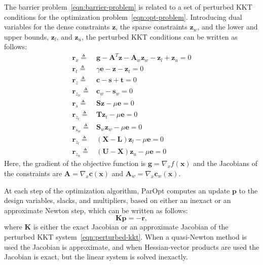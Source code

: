 \documentclass[12pt]{article}
\newcommand{\mb}{\mathbf}
\begin{document}
The barrier problem~\eqref{eqn:barrier-problem} is related to a set of perturbed KKT conditions for the optimization problem~\eqref{eqn:opt-problem}.
Introducing dual variables for the dense constraints $\mb{z}$, the sparse constraints $\mb{z}_{w}$, and the lower and upper bounds, $\mb{z}_{l}$, and $\mb{z}_{u}$, the perturbed KKT conditions can be written as follows:
%
\begin{equation}
  \label{eqn:perturbed-kkt}
  \begin{aligned}
    \mb{r}_{x} \triangleq    & \mb{g} - \mb{A}^{T}\mb{z} - \mb{A}_{w} \mb{z}_{w} - \mb{z}_{l} + \mb{z}_{u} = 0 \\
    \mb{r}_{t} \triangleq    & \gamma \mb{e} - \mb{z} - \mb{z}_{t} = 0 \\
    \mb{r}_{z} \triangleq    & \mb{c} - \mb{s} + \mb{t} = 0 \\
    \mb{r}_{z_{w}} \triangleq & \mb{c}_{w} - \mb{s}_{w} = 0 \\
    \mb{r}_{s} \triangleq    & \mb{S} \mb{z} - \mu \mb{e} = 0 \\
    \mb{r}_{z_{t}} \triangleq & \mb{T}\mb{z}_{t} - \mu \mb{e} = 0 \\
    \mb{r}_{s_{w}} \triangleq & \mb{S}_{w} \mb{z}_{w} - \mu \mb{e} = 0 \\
    \mb{r}_{z_{l}} \triangleq & (\mb{X} - \mb{L})\mb{z}_{l} - \mu \mb{e} = 0 \\
    \mb{r}_{z_{u}} \triangleq & (\mb{U} - \mb{X})\mb{z}_{u} - \mu \mb{e} = 0
  \end{aligned}
\end{equation}
Here, the gradient of the objective function is $\mb{g} = \nabla_{x} f(\mb{x})$ and the Jacobians of the constraints are $\mb{A} = \nabla_{x} \mb{c}(\mb{x})$ and $\mb{A}_{w} = \nabla_{x} \mb{c}_{w}(\mb{x})$.

At each step of the optimization algorithm, ParOpt computes an update $\mb{p}$ to the design variables, slacks, and multipliers, based on either an inexact or an approximate Newton step, which can be written as follows:
%
\begin{equation*}
  \mb{K} \mb{p} = - \mb{r},
\end{equation*}
where $\mb{K}$ is either the exact Jacobian or an approximate Jacobian of the perturbed KKT system~\eqref{eqn:perturbed-kkt}.
When a quasi-Newton method is used the Jacobian is approximate, and when Hessian-vector products are used the Jacobian is exact, but the linear system is solved inexactly.
\end{document}
